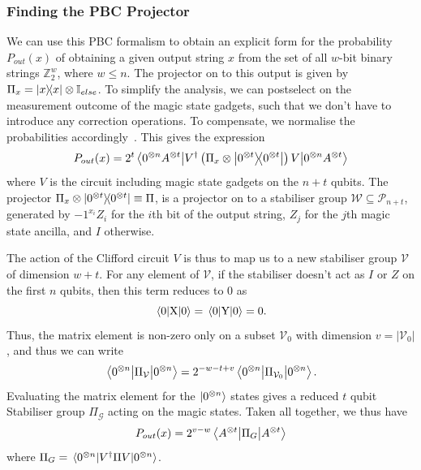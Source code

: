 \documentclass{standalone}
\begin{document}
\subsubsection*{Finding the PBC Projector}\label{sec:pbcproj}
We can use this PBC formalism to obtain an explicit form for the probability $P_{out}(x)$ of obtaining a given output string $x$ from the set of all $w$-bit binary strings $\mathbb{Z}_{2}^{w}$, where $w\leq n$. The projector on to this output is given by $\Pi_{x} = \ketbra{x}{x}\otimes\mathbb{I}_{else}$. To simplify the analysis, we can postselect on the measurement outcome of the magic state gadgets, such that we don't have to introduce any correction operations. To compensate, we normalise the probabilities accordingly~\cite{Bravyi2015}. This gives the expression
\begin{equation}
P_{out}(x) = 2^{t}\matrixel{0^{\otimes n}A^{\otimes t}}{V^{\dagger}\left(\Pi_{x}\otimes\ketbra{0^{\otimes t}}{0^{\otimes t}}\right)V}{0^{\otimes n}A^{\otimes t}}
\end{equation}
where $V$ is the circuit including magic state gadgets on the $n+t$ qubits. The projector $\Pi_{x}\otimes\ketbra{0^{\otimes t}}{0^{\otimes t}}\equiv\Pi$, is a projector on to a stabiliser group $\mathcal{W}\subseteq\mathcal{P}_{n+t}$, generated by $-1^{x_{i}}Z_{i}$ for the $i$th bit of the output string, $Z_{j}$ for the $j$th magic state ancilla, and $I$ otherwise.
\par
The action of the Clifford circuit $V$ is thus to map us to a new stabiliser group $\mathcal{V}$ of dimension $w+t$. For any element of $\mathcal{V}$, if the stabiliser doesn't act as $I$ or $Z$ on the first $n$ qubits, then this term reduces to $0$ as 
\[\matrixel{0}{\text{X}}{0}=\matrixel{0}{\text{Y}}{0}=0.\]
Thus, the matrix element is non-zero only on a subset $\mathcal{V}_{0}$ with dimension $v=\vert\mathcal{V}_{0}\vert$, and thus we can write
\begin{equation}
    \matrixel{0^{\otimes n}}{\Pi_{\mathcal{V}}}{0^{\otimes n}} = 2^{-w-t+v}\matrixel{0^{\otimes n}}{\Pi_{\mathcal{V}_{0}}}{0^{\otimes n}}.
\end{equation}
Evaluating the matrix element for the $\ket{0^{\otimes n}}$ states gives a reduced $t$ qubit Stabiliser group $\Pi_{\mathcal{G}}$ acting on the magic states. Taken all together, we thus have 
\begin{equation}
    P_{out}(x) = 2^{v-w}\matrixel{A^{\otimes t}}{\Pi_{G}}{A^{\otimes t}}
\end{equation}
where $\Pi_{G}=\matrixel{0^{\otimes n}}{V^{\dagger}\Pi V}{0^{\otimes n}}$. 
\end{document}
